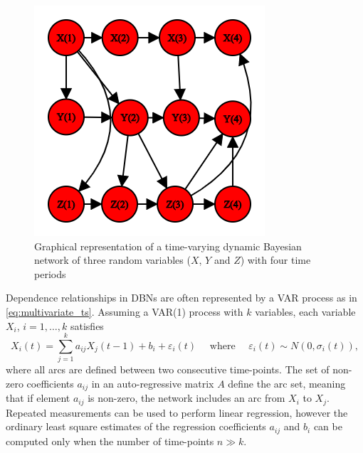 \begin{figure}[H]
\centering
  \includegraphics[width=0.45\linewidth]{figures/dynamic_bn.png}
  \caption{Graphical representation of a time-varying dynamic Bayesian network of three random variables ($X$, $Y$ and $Z$) with four time periods}
  \label{fig:dynamic_bn}
\end{figure}


Dependence relationships in \acp{DBN} are often represented by a \ac{VAR} process as in \autoref{eq:multivariate_ts}. Assuming a \ac{VAR}(1) process with $k$ variables, each variable $X_i$, $i = 1,\ldots,k$ satisfies
\begin{equation}
X_{i}(t)=\sum_{j=1}^{k} a_{i j} X_{j}(t-1)+b_{i}+\varepsilon_{i}(t) \quad \text { where } \quad \varepsilon_{i}(t) \sim N\left(0, \sigma_{i}(t)\right),
\end{equation}
where all arcs are defined between two consecutive time-points. The set of non-zero coefficients $a_{ij}$ in an auto-regressive matrix $A$ define the arc set, meaning that if element $a_{ij}$ is non-zero, the network includes an arc from $X_i$ to $X_j$. Repeated measurements can be used to perform linear regression, however the ordinary least square estimates of the regression coefficients $a_{ij}$ and $b_i$ can be computed only when the number of time-points $n \gg k$.





